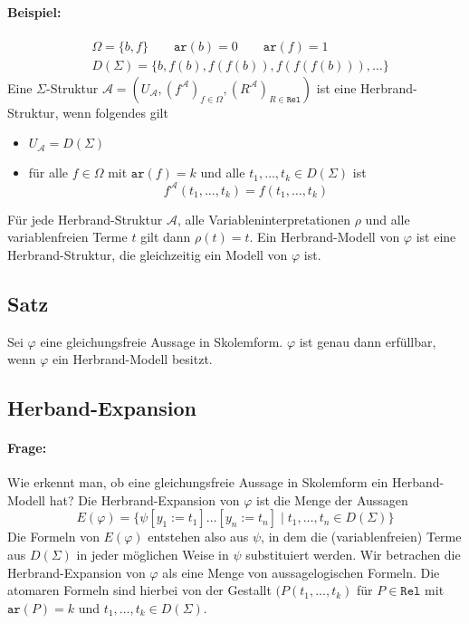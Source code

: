 \documentclass[12pt,a4paper]{report}
\newcommand{\ls}{\newline\newline}
\newcommand{\red}[1]{\textcolor[rgb]{0.9,0.2,0.2}{#1}}
\newcommand{\green}[1]{\textcolor[rgb]{0.1,0.6,0.1}{#1}}
\newcommand{\blue}[1]{\textcolor[rgb]{0.2,0.2,1}{#1}}
\begin{document}
\paragraph{Beispiel:}
\begin{align*}
    & \Omega = \{b, f\} \qquad \texttt{ar}(b) = 0 \qquad \texttt{ar}(f) = 1\\
    & D(\Sigma) = \{ b, f(b), f(f(b)), f(f(f(b))),\dots \}
\end{align*}
Eine $ \Sigma $-Struktur $ \mathcal{A} = (U_\mathcal{A}, (f^\mathcal{A})_{f \in \Omega}, (R^\mathcal{A})_{R \in \texttt{Rel}}) $ ist eine \red{Herbrand-Struktur}, wenn folgendes gilt
\begin{itemize}
    \item $ U_\mathcal{A} = D(\Sigma)  $
    \item für alle $ f \in \Omega $ mit $ \texttt{ar}(f) = k $ und alle $ t_1,\dots,t_k \in D(\Sigma) $ ist
    \[
        f^\mathcal{A}(t_1,\dots,t_k) = f(t_1,\dots,t_k)
    \]
\end{itemize}
Für jede Herbrand-Struktur $ \mathcal{A} $, alle Variableninterpretationen $ \rho $ und alle variablenfreien Terme $ t $ gilt dann $ \rho(t) = t $.\ls
Ein \red{Herbrand-Modell} von $ \varphi $ ist eine \red{Herbrand-Struktur}, die gleichzeitig ein Modell von $ \varphi $ ist.

\subsection{\green{Satz}}
Sei $ \varphi $ eine gleichungsfreie Aussage in Skolemform. $ \varphi $ ist genau dann erfüllbar, wenn $ \varphi $ ein Herbrand-Modell besitzt.

\subsection{\blue{Herband-Expansion}}
\paragraph{Frage:} Wie erkennt man, ob eine gleichungsfreie Aussage in Skolemform ein Herband-Modell hat?\ls
Die \red{Herbrand-Expansion} von $ \varphi $ ist die Menge der Aussagen
\[
    E(\varphi) = \{ \psi[y_1 := t_1]\dots[y_n := t_n] \mid t_1,\dots,t_n \in D(\Sigma) \}
\]
Die Formeln von $ E(\varphi) $ entstehen also aus $ \psi $, in dem die (variablenfreien) Terme aus $ D(\Sigma) $ in jeder möglichen Weise in $ \psi $ substituiert werden. \ls
Wir betrachen die Herbrand-Expansion von $ \varphi $ als eine Menge von \red{aussagelogischen Formeln}. Die atomaren Formeln sind hierbei von der Gestallt $ (P(t_1,\dots,t_k) $ für $ P \in \texttt{Rel} $ mit $ \texttt{ar}(P) = k $ und $ t_1,\dots,t_k \in D(\Sigma) $.
\end{document}
